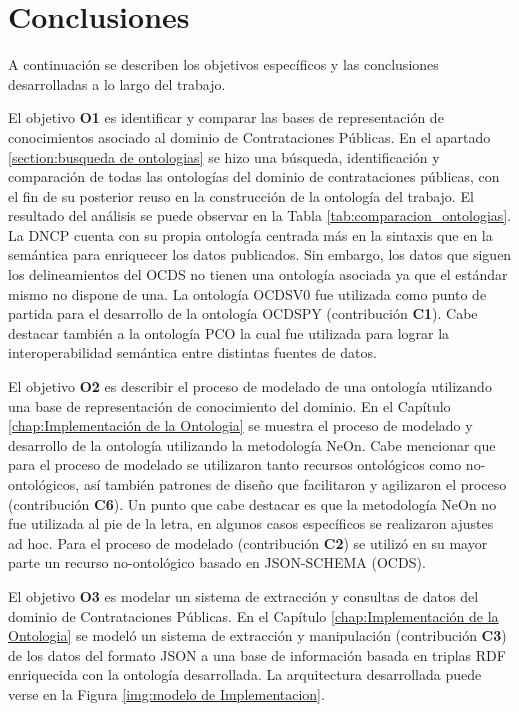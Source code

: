 \section{Conclusiones}
\label{chap:analisis}
A continuación se describen los objetivos específicos y las conclusiones desarrolladas a lo largo del trabajo.  

El objetivo \textbf{O1} es identificar y comparar las bases de representación de conocimientos asociado al dominio de Contrataciones Públicas. En el apartado \ref{section:busqueda de ontologias} se hizo una búsqueda, identificación y comparación de todas las ontologías del dominio de contrataciones públicas, con el fin de su posterior reuso en la construcción de la ontología del trabajo. El resultado del análisis se puede observar en la Tabla \ref{tab:comparacion_ontologias}. La DNCP cuenta con su propia ontología centrada más en la sintaxis que en la semántica para enriquecer los datos publicados. Sin embargo, los datos que siguen los delineamientos del OCDS no tienen una ontología asociada ya que el estándar mismo no dispone de una. La ontología OCDSV0 fue utilizada como punto de partida para el desarrollo de la ontología OCDSPY (contribución \textbf{C1}). Cabe destacar también a la ontología PCO la cual fue utilizada para lograr la interoperabilidad semántica entre distintas fuentes de datos.

El objetivo \textbf{O2} es describir el proceso de modelado de una ontología utilizando una base de representación de conocimiento del dominio. En el Capítulo \ref{chap:Implementación de la Ontologia} se muestra el proceso de modelado y desarrollo de la ontología utilizando la metodología NeOn. Cabe mencionar que para el proceso de modelado se utilizaron tanto recursos ontológicos como no-ontológicos, así también patrones de diseño que facilitaron y agilizaron el proceso (contribución \textbf{C6}). Un punto que cabe destacar es que la metodología NeOn no fue utilizada al pie de la letra, en algunos casos específicos se realizaron ajustes ad hoc. Para el proceso de modelado (contribución \textbf{C2}) se utilizó en su mayor parte un recurso no-ontológico basado en JSON-SCHEMA (OCDS).

El objetivo \textbf{O3} es modelar un sistema de extracción y consultas de datos del dominio de Contrataciones Públicas. En el Capítulo \ref{chap:Implementación de la Ontologia} se modeló un sistema de extracción y manipulación (contribución \textbf{C3}) de los datos del formato JSON a una base de información basada en triplas RDF enriquecida con la ontología desarrollada. La arquitectura desarrollada puede verse en la Figura \ref{img:modelo de Implementacion}.

